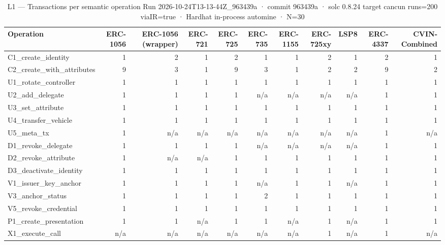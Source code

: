 \begin{table}[ht]
\centering
\small
\begin{tabular}{lrrrrrrrrrr}
\toprule
Operation & ERC-1056 & ERC-1056 (wrapper) & ERC-721 & ERC-725 & ERC-735 & ERC-1155 & ERC-725xy & LSP8 & ERC-4337 & CVIN-Combined \\
\midrule
C1\_create\_identity & 1 & 2 & 1 & 2 & 1 & 1 & 2 & 1 & 2 & 1 \\
C2\_create\_with\_attributes & 9 & 3 & 1 & 9 & 3 & 1 & 2 & 2 & 9 & 2 \\
U1\_rotate\_controller & 1 & 1 & 1 & 1 & 1 & 1 & 1 & 1 & 1 & 1 \\
U2\_add\_delegate & 1 & 1 & 1 & 1 & n/a & n/a & n/a & n/a & 1 & 1 \\
U3\_set\_attribute & 1 & 1 & 1 & 1 & 1 & 1 & 1 & 1 & 1 & 1 \\
U4\_transfer\_vehicle & 1 & 1 & 1 & 1 & 1 & 1 & 1 & 1 & 1 & 1 \\
U5\_meta\_tx & 1 & n/a & n/a & n/a & n/a & n/a & n/a & n/a & 1 & n/a \\
D1\_revoke\_delegate & 1 & 1 & 1 & 1 & n/a & n/a & n/a & n/a & 1 & 1 \\
D2\_revoke\_attribute & 1 & n/a & n/a & 1 & 1 & 1 & 1 & 1 & 1 & 1 \\
D3\_deactivate\_identity & 1 & 1 & 1 & 1 & 1 & 1 & 1 & 1 & 1 & 1 \\
V1\_issuer\_key\_anchor & 1 & 1 & 1 & 1 & n/a & 1 & 1 & n/a & 1 & 1 \\
V3\_anchor\_status & 1 & 1 & 1 & 1 & 2 & 1 & 1 & 1 & 1 & 1 \\
V5\_revoke\_credential & 1 & 1 & 1 & 1 & 1 & 1 & 1 & 1 & 1 & 1 \\
P1\_create\_presentation & 1 & 1 & n/a & 1 & 1 & n/a & 1 & n/a & 1 & 1 \\
X1\_execute\_call & n/a & n/a & n/a & n/a & n/a & n/a & 1 & n/a & 1 & n/a \\
\bottomrule
\end{tabular}
\caption{L1 — Transactions per semantic operation Run 2026-10-24T13-13-44Z\_963439a · commit 963439a · solc 0.8.24 target cancun runs=200 viaIR=true · Hardhat in-process automine · N=30}
\label{tab:crud_txcount}
\end{table}
